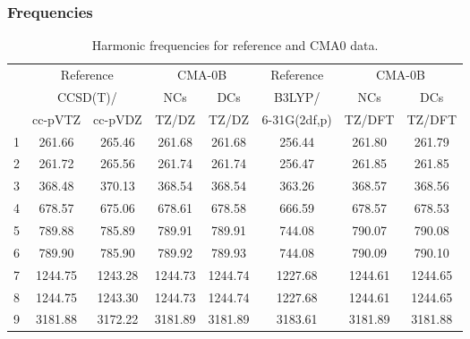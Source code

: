 \documentclass[10pt,oneside]{article}
\begin{document}
\subsubsection*{Frequencies}
\begin{table}[h!]
\centering
\caption{Harmonic frequencies for reference and CMA0 data.}
\begin{tabular}{cccccccc}
\toprule
{} & \multicolumn{2}{c}{Reference} & \multicolumn{2}{c}{CMA-0B} &    Reference & \multicolumn{2}{c}{CMA-0B} \\
{} & \multicolumn{2}{c}{CCSD(T)/} &     NCs &     DCs &       B3LYP/ &     NCs &     DCs \\
{} &   cc-pVTZ & cc-pVDZ &   TZ/DZ &   TZ/DZ & 6-31G(2df,p) &  TZ/DFT &  TZ/DFT \\
\midrule
1 &    261.66 &  265.46 &  261.68 &  261.68 &       256.44 &  261.80 &  261.79 \\
2 &    261.72 &  265.56 &  261.74 &  261.74 &       256.47 &  261.85 &  261.85 \\
3 &    368.48 &  370.13 &  368.54 &  368.54 &       363.26 &  368.57 &  368.56 \\
4 &    678.57 &  675.06 &  678.61 &  678.58 &       666.59 &  678.57 &  678.53 \\
5 &    789.88 &  785.89 &  789.91 &  789.91 &       744.08 &  790.07 &  790.08 \\
6 &    789.90 &  785.90 &  789.92 &  789.93 &       744.08 &  790.09 &  790.10 \\
7 &   1244.75 & 1243.28 & 1244.73 & 1244.74 &      1227.68 & 1244.61 & 1244.65 \\
8 &   1244.75 & 1243.30 & 1244.73 & 1244.74 &      1227.68 & 1244.61 & 1244.65 \\
9 &   3181.88 & 3172.22 & 3181.89 & 3181.89 &      3183.61 & 3181.89 & 3181.88 \\
\bottomrule
\end{tabular}
\end{table}

\clearpage
\end{document}
